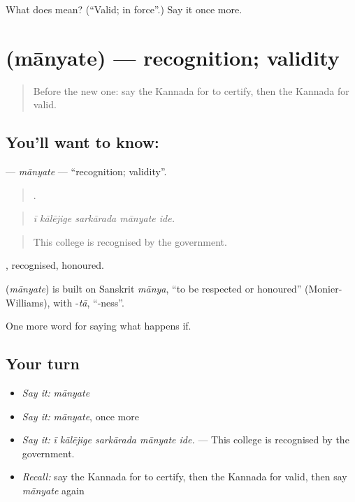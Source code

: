 \begin{tcolorbox}[breakable,colback=teal!4,colframe=teal!35!black,title={Before you move on}]
What does  mean? (\textquotedblleft{}Valid; in force\textquotedblright{}.) Say it once more.
\end{tcolorbox}
\section[\texorpdfstring{\kn{ಮಾನ್ಯತೆ} (mānyate)}{ಮಾನ್ಯತೆ (mānyate)}]{ (mānyate) — recognition; validity}

\label{lesson:KA-C425-manyate}



\begin{quote}
Before the new one: say the Kannada for to certify, then the Kannada for valid.
\end{quote}

\subsection*{You'll want to know: }
\textbf{} — \emph{mānyate} — \textquotedblleft{}recognition; validity\textquotedblright{}.

\begin{quote}
    .
\end{quote}

\begin{quote}
\emph{ī kālējige sarkārada mānyate ide.}
\end{quote}

\begin{quote}
This college is recognised by the government.
\end{quote}

, recognised, honoured.

\begin{cousinweb}
\textbf{} (\emph{mānyate}) is built on Sanskrit \emph{mānya}, \textquotedblleft{}to be respected or honoured\textquotedblright{} (Monier-Williams), with -\emph{tā}, \textquotedblleft{}-ness\textquotedblright{}.
\end{cousinweb}

\begin{grammarlens}[title={What you've built}]
One more word for saying what happens if.
\end{grammarlens}

\subsection*{Your turn}
\begin{itemize}
\raggedright
  \item \emph{Say it:} \emph{mānyate}
  \item \emph{Say it:} \emph{mānyate}, once more
  \item \emph{Say it:} \emph{ī kālējige sarkārada mānyate ide.} — This college is recognised by the government.
  \item \emph{Recall:} say the Kannada for to certify, then the Kannada for valid, then say \emph{mānyate} again
\end{itemize}


